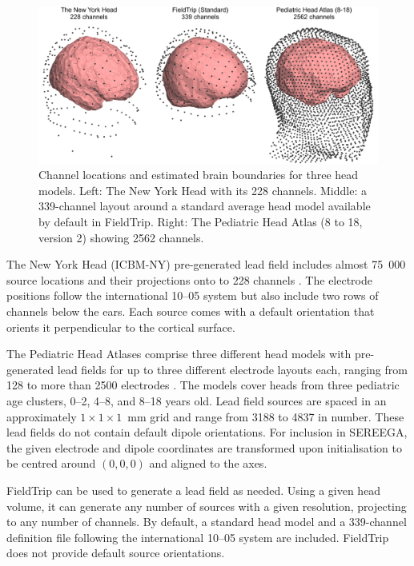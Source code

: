 \begin{figure}
    \centering
    \includegraphics[width=5in]{figures/sereega-headmodels.png}
    \caption[Channel locations and estimated brain boundaries for three head models.]{Channel locations and estimated brain boundaries for three head models. Left: The New York Head with its 228 channels. Middle: a 339-channel layout around a standard average head model available by default in FieldTrip. Right: The Pediatric Head Atlas (8 to 18, version 2) showing 2562 channels.}
    \label{fig:sereega:chanlocs}
\end{figure}

The New York Head (ICBM-NY) pre-generated lead field includes almost 75~000 source locations and their projections onto to 228 channels \cite{huang2016nyhead}. The electrode positions follow the international 10--05 system \cite{oostenveld2001fivepercent} but also include two rows of channels below the ears. Each source comes with a default orientation that orients it perpendicular to the cortical surface. 

The Pediatric Head Atlases comprise three different head models with pre-generated lead fields for up to three different electrode layouts each, ranging from 128 to more than 2500 electrodes \cite{song2013phm}. The models cover heads from three pediatric age clusters, 0--2, 4--8, and 8--18 years old. Lead field sources are spaced in an approximately $1\times1\times1$~mm grid and range from 3188 to 4837 in number. These lead fields do not contain default dipole orientations. For inclusion in SEREEGA, the given electrode and dipole coordinates are transformed upon initialisation to be centred around $(0,0,0)$ and aligned to the axes.

FieldTrip \cite{oostenveld2011fieldtrip} can be used to generate a lead field as needed. Using a given head volume, it can generate any number of sources with a given resolution, projecting to any number of channels. By default, a standard head model and a 339-channel definition file following the international 10--05 system are included. FieldTrip does not provide default source orientations.

